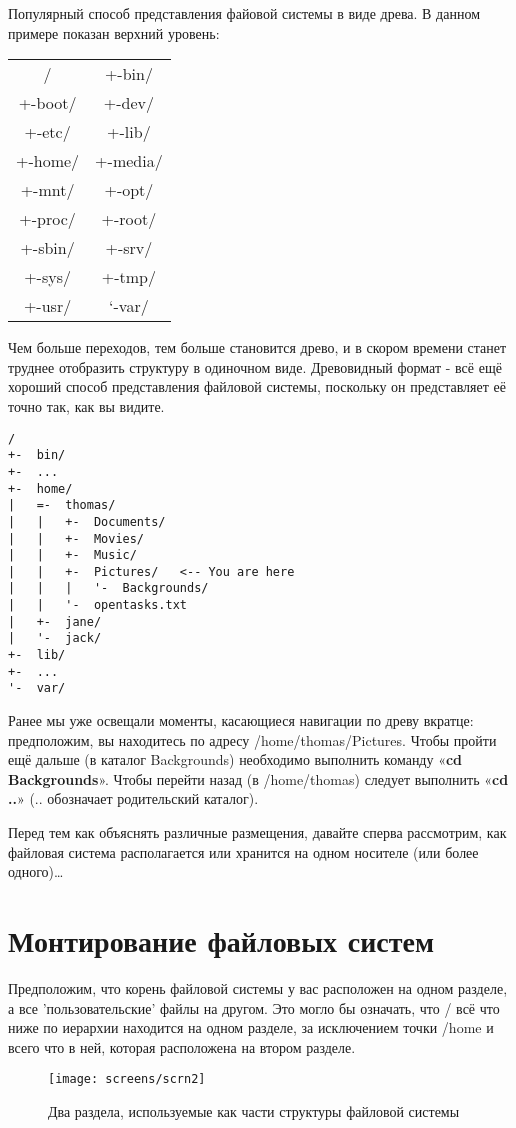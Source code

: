 \documentclass[12pt]{book}
\begin{document}
Популярный способ представления файовой системы в виде древа. В данном примере показан верхний уровень:

\vspace{3mm}
\begin{tcolorbox}
\begin{tabular}{cc}
	/ & +-bin/\\
	+-boot/ & +-dev/\\
	+-etc/ & +-lib/\\
	+-home/ & +-media/\\
	+-mnt/ & +-opt/\\
	+-proc/ & +-root/\\
	+-sbin/ & +-srv/\\
	+-sys/ & +-tmp/\\
	+-usr/ & `-var/\\
\end{tabular}
\end{tcolorbox}

Чем больше переходов, тем больше становится древо, и в скором времени станет труднее отобразить структуру в одиночном виде. Древовидный формат - всё ещё хороший способ представления файловой системы, поскольку он представляет её точно так, как вы видите.

\vspace{3mm}
\begin{tcolorbox}
\begin{lstlisting}
/
+-	bin/
+-	...
+-	home/
|	=-	thomas/
|	|	+-	Documents/
|	|	+-	Movies/
|	|	+-	Music/
|	|	+-	Pictures/	<-- You are here
|	|	|	'-	Backgrounds/
|	|	'-	opentasks.txt
|	+-	jane/
|	'-	jack/
+-	lib/
+-	...
'-	var/
\end{lstlisting}
\end{tcolorbox}

Ранее мы уже освещали моменты, касающиеся навигации по древу вкратце: предположим, вы находитесь по адресу /home/thomas/Pictures. Чтобы пройти ещё дальше (в каталог Backgrounds) необходимо выполнить команду «\textbf{cd Backgrounds}». Чтобы перейти назад (в /home/thomas) следует выполнить «\textbf{cd ..}» (.. обозначает родительский каталог).

Перед тем как объяснять различные размещения, давайте сперва рассмотрим, как файловая система располагается или хранится на одном носителе (или более одного)\ldots

\section{Монтирование файловых систем}

Предположим, что корень файловой системы у вас расположен на одном разделе, а все 'пользовательские' файлы на другом. Это могло бы означать, что / всё что ниже по иерархии находится на одном разделе, за исключением точки /home и всего что в ней, которая расположена на втором разделе.

\begin{figure}[!t]
\centering
\texttt{[image: screens/scrn2]}
\caption{Два раздела, используемые как части структуры файловой системы}
\end{figure}
\end{document}
